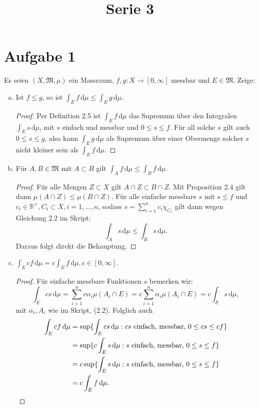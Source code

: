 \documentclass[10pt]{article}\usepackage[]{graphicx}\usepackage[]{color}
\title{Serie 3}
\date{}
\newcommand{\R}{\mathbb{R}}
\newcommand{\df}{\,\textrm{d}}
\begin{document}
\maketitle

\section*{Aufgabe 1}
Es seien $(X, \mathfrak{M}, \mu)$ ein Massraum,
$f,g: X \to [0, \infty]$ messbar
und $E \in \mathfrak{M}$. Zeige:
\begin{enumerate}[(a)]
  \item Ist $f \leq g$, so ist $\int_E f \df \mu \leq \int_E g \df \mu$.
  \begin{proof}
    Per Definition 2.5 ist $\int_E f \df \mu$
    das Supremum über den Integralen $\int_E s \df \mu$,
    mit $s$ einfach und messbar und $0 \leq s \leq f$.
    Für all solche $s$ gilt auch $0 \leq s \leq g$,
    also kann $\int_E g \df \mu$ als Supremum
    über einer Obermenge solcher $s$ nicht kleiner sein als
    $\int_E f \df \mu$.
  \end{proof}
  
  \item Für $A, B \in \mathfrak{M}$ mit $A \subset B$ gilt
  $\int_A f \df \mu \leq \int_B f \df \mu$.
  \begin{proof}
    Für alle Mengen $Z \subset X$ gilt $A \cap Z \subset B \cap Z$.
    Mit Proposition 2.4 gilt dann $\mu(A \cap Z) \leq \mu(B \cap Z)$.
    Für alle einfache messbare $s$ mit $s \leq f$
    und $c_i \in \R^+, C_i \subset X, i = 1, \dots, n$, 
    sodass $s = \sum_{i=1}^n c_i\chi_{C_i}$
    gilt dann wegen Gleichung 2.2 im Skript:
    \[
      \int_A s \df \mu \leq \int_B s \df \mu.
    \]
    Daraus folgt direkt die Behauptung.
  \end{proof}
  
  \item $\int_E cf \df \mu = c \int_E f \df \mu, c \in [0, \infty]$.
  \begin{proof}
  Für einfache messbare Funktionen $s$ bemerken wir:
    \[
      \int_E cs \df \mu = \sum_{i=1}^n c\alpha_i \mu(A_i \cap E) = c\sum_{i=1}^n \alpha_i \mu(A_i \cap E) = c \int_E s \df \mu,
    \]
  mit $\alpha_i, A_i$ wie im Skript, (2.2).
  Folglich auch
    \begin{align*}
      \int_E cf \df \mu 
      &= \sup\{\int_E cs \df \mu : \textrm{$cs$ einfach, messbar, $0 \leq cs \leq cf$}\} \\
      &= \sup\{c\int_E s \df \mu : \textrm{$s$ einfach, messbar, $0 \leq s \leq f$}\} \\
      &= c\sup\{\int_E s \df \mu : \textrm{$s$ einfach, messbar, $0 \leq s \leq f$}\} \\
      &= c\int_E f \df \mu.\qedhere
    \end{align*}
  \end{proof}
  

\end{enumerate}
\end{document}
